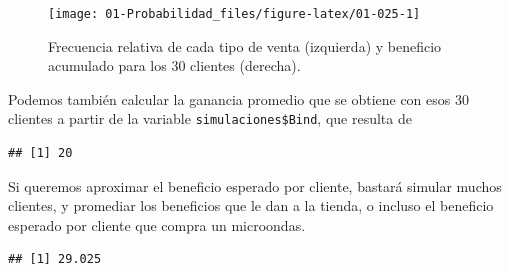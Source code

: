 \documentclass[
]{book}
\newenvironment{Shaded}{\begin{snugshade}}{\end{snugshade}}
\newcommand{\CommentTok}[1]{\textcolor[rgb]{0.56,0.35,0.01}{\textit{#1}}}
\newcommand{\DecValTok}[1]{\textcolor[rgb]{0.00,0.00,0.81}{#1}}
\newcommand{\FunctionTok}[1]{\textcolor[rgb]{0.00,0.00,0.00}{#1}}
\newcommand{\NormalTok}[1]{#1}
\newcommand{\OtherTok}[1]{\textcolor[rgb]{0.56,0.35,0.01}{#1}}
\newcommand{\SpecialCharTok}[1]{\textcolor[rgb]{0.00,0.00,0.00}{#1}}
\newcommand{\StringTok}[1]{\textcolor[rgb]{0.31,0.60,0.02}{#1}}
\theoremstyle{definition}
\theoremstyle{definition}
\theoremstyle{definition}
\theoremstyle{definition}
\theoremstyle{remark}
\begin{document}
\begin{figure}

{\centering \texttt{[image: 01-Probabilidad\_files/figure-latex/01-025-1]} 

}

\caption{Frecuencia relativa de cada tipo de venta (izquierda) y beneficio acumulado para los 30 clientes (derecha).}\label{fig:01-025}
\end{figure}

Podemos también calcular la ganancia promedio que se obtiene con esos 30 clientes a partir de la variable \texttt{simulaciones\$Bind}, que resulta de

\begin{Shaded}
\end{Shaded}

\begin{verbatim}
## [1] 20
\end{verbatim}

Si queremos aproximar el beneficio esperado por cliente, bastará simular muchos clientes, y promediar los beneficios que le dan a la tienda, o incluso el beneficio esperado por cliente que compra un microondas.

\begin{Shaded}
\end{Shaded}

\begin{verbatim}
## [1] 29.025
\end{verbatim}

\begin{Shaded}
\end{Shaded}
\end{document}
